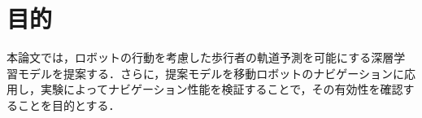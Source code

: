 
\section{目的}


本論文では，ロボットの行動を考慮した歩行者の軌道予測を可能にする深層学習モデルを提案する．さらに，提案モデルを移動ロボットのナビゲーションに応用し，実験によってナビゲーション性能を検証することで，その有効性を確認することを目的とする．

